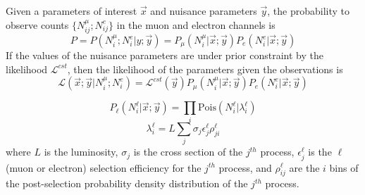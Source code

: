 \documentclass{article}
\newcommand{\lik}{\mathcal{L}}
\newcommand{\interest}{\vec{x}}
\newcommand{\nuis}{\vec{y}}
\begin{document}
Given a parameters of interest $\interest$ and nuisance parameters $\nuis$,
the probability to observe counts $\{N_{ij}^{\mu};N_{ij}^e\}$ in the
muon and electron channels is
\[P 
= P\left(N_i^{\mu};N_i^e | y;\nuis\right) =
P_{\mu}\left(N_i^{\mu}|\interest;\nuis\right)P_e\left(N_i^e|\interest;\nuis\right)\]
If the values of the nuisance parameters are under prior constraint
by the likelihood $\lik^{cst}$, then the likelihood of the parameters
given the observations is
\begin{equation}
  \lik\left(\interest;\nuis|N_i^{\mu};N_i^e\right) = \lik^{cst}(\nuis)P_{\mu}(N_i^\mu|\interest;\nuis)P_e(N_i^e|\interest;\nuis)
\end{equation}


\begin{equation}
  P_\ell\left(N_i^\ell|\interest;\nuis\right) = \prod_i \mathrm{Pois}\left(N_i^\ell|\lambda_i^\ell\right)
\end{equation}
\begin{equation}
  \lambda_i^\ell = L\sum_j\sigma_j\epsilon_j^\ell\rho_{ji}^\ell
\end{equation}
where $L$ is the luminosity, $\sigma_j$ is the cross section of the
$j^{th}$ process, $\epsilon^\ell_j$ is the $\ell$ (muon or electron)
selection efficiency for the $j^{th}$ process, and $\rho^\ell_{ij}$ are
the $i$ bins of the post-selection probability density distribution of
the $j^{th}$ process.
\end{document}
